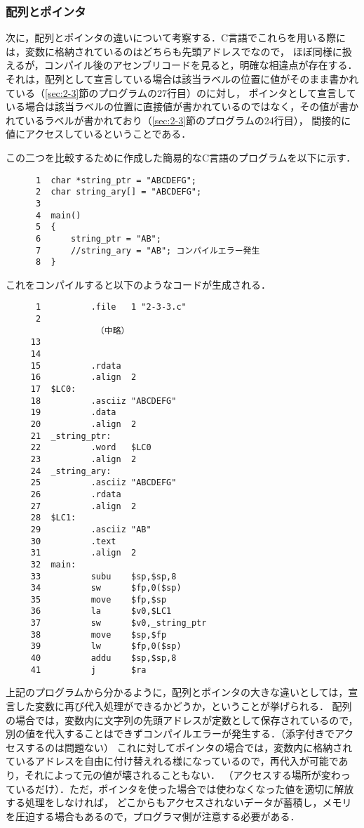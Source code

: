 \documentclass[a4j,11pt]{jarticle}
\begin{document}
\subsubsection{配列とポインタ}

次に，配列とポインタの違いについて考察する．C言語でこれらを用いる際には，変数に格納されているのはどちらも先頭アドレスでなので，
ほぼ同様に扱えるが，コンパイル後のアセンブリコードを見ると，明確な相違点が存在する．
それは，配列として宣言している場合は該当ラベルの位置に値がそのまま書かれている（\ref{sec:2-3}節のプログラムの27行目）のに対し，
ポインタとして宣言している場合は該当ラベルの位置に直接値が書かれているのではなく，その値が書かれているラベルが書かれており（\ref{sec:2-3}節のプログラムの24行目），
間接的に値にアクセスしているということである．

この二つを比較するために作成した簡易的なC言語のプログラムを以下に示す．

\begin{verbatim}
      1  char *string_ptr = "ABCDEFG";
      2  char string_ary[] = "ABCDEFG";
      3
      4  main()
      5  {
      6      string_ptr = "AB";
      7      //string_ary = "AB"; コンパイルエラー発生
      8  }
\end{verbatim}

これをコンパイルすると以下のようなコードが生成される．

\begin{verbatim}
      1          .file   1 "2-3-3.c"
      2
                  （中略）
     13
     14
     15          .rdata
     16          .align  2
     17  $LC0:
     18          .asciiz "ABCDEFG"
     19          .data
     20          .align  2
     21  _string_ptr:
     22          .word   $LC0
     23          .align  2
     24  _string_ary:
     25          .asciiz "ABCDEFG"
     26          .rdata
     27          .align  2
     28  $LC1:
     29          .asciiz "AB"
     30          .text
     31          .align  2
     32  main:
     33          subu    $sp,$sp,8
     34          sw      $fp,0($sp)
     35          move    $fp,$sp
     36          la      $v0,$LC1
     37          sw      $v0,_string_ptr
     38          move    $sp,$fp
     39          lw      $fp,0($sp)
     40          addu    $sp,$sp,8
     41          j       $ra
\end{verbatim}

上記のプログラムから分かるように，配列とポインタの大きな違いとしては，宣言した変数に再び代入処理ができるかどうか，ということが挙げられる．
配列の場合では，変数内に文字列の先頭アドレスが定数として保存されているので，別の値を代入することはできずコンパイルエラーが発生する．（添字付きでアクセスするのは問題ない）
これに対してポインタの場合では，変数内に格納されているアドレスを自由に付け替えれる様になっているので，再代入が可能であり，それによって元の値が壊されることもない．
（アクセスする場所が変わっているだけ）．ただ，ポインタを使った場合では使わなくなった値を適切に解放する処理をしなければ，
どこからもアクセスされないデータが蓄積し，メモリを圧迫する場合もあるので，プログラマ側が注意する必要がある．
\end{document}
